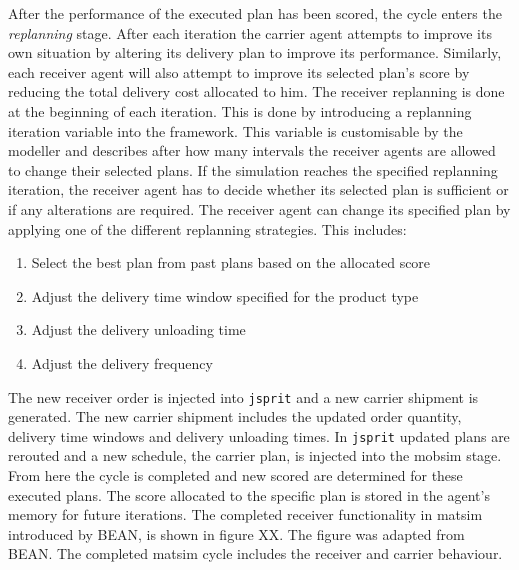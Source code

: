 After the performance of the executed plan has been scored, the cycle enters the \textit{replanning} stage. After each iteration the carrier agent attempts to improve its own situation by altering its delivery plan to improve its performance. Similarly, each receiver agent will also attempt to improve its selected plan's score by reducing the total delivery cost allocated to him. The receiver replanning is done at the beginning of each iteration. This is done by introducing a replanning iteration variable into the framework. This variable is customisable by the modeller and describes after how many intervals the receiver agents are allowed to change their selected plans. If the simulation reaches the specified replanning iteration, the receiver agent has to decide whether its selected plan is sufficient or if any alterations are required. The receiver agent can change its specified plan by applying one of the different replanning strategies. This includes:
\begin{enumerate}
    \item Select the best plan from past plans based on the allocated score
    \item Adjust the delivery time window specified for the product type
    \item Adjust the delivery unloading time
    \item Adjust the delivery frequency 
\end{enumerate}

The new receiver order is injected into \texttt{jsprit} and a new carrier shipment is generated. The new carrier shipment includes the updated order quantity, delivery time windows and delivery unloading times. In \texttt{jsprit} updated plans are rerouted and a new schedule, the carrier plan, is injected into the mobsim stage. From here the cycle is completed and new scored are determined for these executed plans. The score allocated to the specific plan is stored in the agent's memory for future iterations. The completed receiver functionality in \acrshort{matsim} introduced by BEAN, is shown in figure XX. The figure was adapted from BEAN. The completed \acrshort{matsim} cycle includes the receiver and carrier behaviour.

